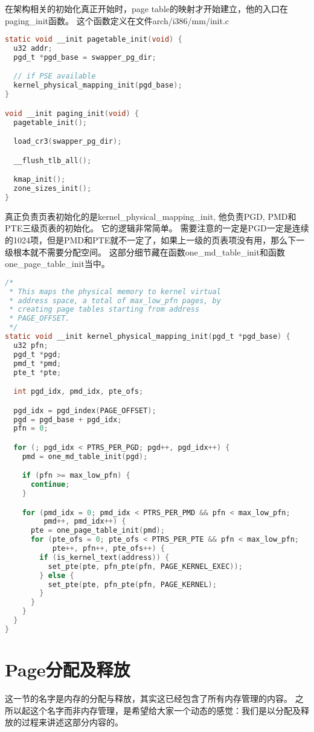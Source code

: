 在架构相关的初始化真正开始时，page table的映射才开始建立，他的入口在paging\_init函数。
这个函数定义在文件arch/i386/mm/init.c
\begin{lstlisting}[language=C]
static void __init pagetable_init(void) {
  u32 addr;
  pgd_t *pgd_base = swapper_pg_dir;

  // if PSE available
  kernel_physical_mapping_init(pgd_base);
}

void __init paging_init(void) {
  pagetable_init();

  load_cr3(swapper_pg_dir);

  __flush_tlb_all();

  kmap_init();
  zone_sizes_init();
}
\end{lstlisting}


真正负责页表初始化的是kernel\_physical\_mapping\_init, 他负责PGD, PMD和PTE三级页表的初始化。
它的逻辑非常简单。
需要注意的一定是PGD一定是连续的1024项，但是PMD和PTE就不一定了，如果上一级的页表项没有用，那么下一级根本就不需要分配空间。
这部分细节藏在函数one\_md\_table\_init和函数one\_page\_table\_init当中。
\begin{lstlisting}[language=C]
/*
 * This maps the physical memory to kernel virtual 
 * address space, a total of max_low_pfn pages, by 
 * creating page tables starting from address
 * PAGE_OFFSET.
 */
static void __init kernel_physical_mapping_init(pgd_t *pgd_base) {
  u32 pfn;
  pgd_t *pgd;
  pmd_t *pmd;
  pte_t *pte;

  int pgd_idx, pmd_idx, pte_ofs;

  pgd_idx = pgd_index(PAGE_OFFSET);
  pgd = pgd_base + pgd_idx;
  pfn = 0;

  for (; pgd_idx < PTRS_PER_PGD; pgd++, pgd_idx++) {
    pmd = one_md_table_init(pgd);

    if (pfn >= max_low_pfn) {
      continue;
    }

    for (pmd_idx = 0; pmd_idx < PTRS_PER_PMD && pfn < max_low_pfn;
         pmd++, pmd_idx++) {
      pte = one_page_table_init(pmd);
      for (pte_ofs = 0; pte_ofs < PTRS_PER_PTE && pfn < max_low_pfn;
           pte++, pfn++, pte_ofs++) {
        if (is_kernel_text(address)) {
          set_pte(pte, pfn_pte(pfn, PAGE_KERNEL_EXEC));
        } else {
          set_pte(pte, pfn_pte(pfn, PAGE_KERNEL);
        }
      }
    }
  }
}
\end{lstlisting}


\section{Page分配及释放}
 这一节的名字是内存的分配与释放，其实这已经包含了所有内存管理的内容。
之所以起这个名字而非内存管理，是希望给大家一个动态的感觉：我们是以分配及释放的过程来讲述这部分内容的。


